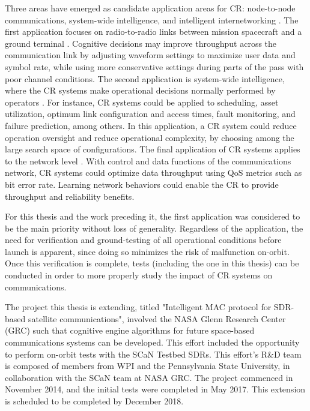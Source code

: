 	\par Three areas have emerged as candidate application areas for CR: node-to-node communications, system-wide intelligence, and intelligent internetworking \cite{paulo_thesis}. The first application focuses on radio-to-radio links between mission spacecraft and a ground terminal \cite{paulo_thesis}. Cognitive decisions may improve throughput across the communication link by adjusting waveform settings to maximize user data and symbol rate, while using more conservative settings during parts of the pass with poor channel conditions. The second application is system-wide intelligence, where the CR systems make operational decisions normally performed by operators \cite{paulo_thesis}. For instance, CR systems could be applied to scheduling, asset utilization, optimum link configuration and access times, fault monitoring, and failure prediction, among others. In this application, a CR system could reduce operation oversight and reduce operational complexity, by choosing among the large search space of configurations. The final application of CR systems applies to the network level \cite{paulo_thesis}. With control and data functions of the communications network, CR systems could optimize data throughput using QoS metrics such as bit error rate. Learning network behaviors could enable the CR to provide throughput and reliability benefits.
	\par  For this thesis and the work preceding it, the first application was considered to be the main priority without loss of generality. Regardless of the application, the need for verification and ground-testing of all operational conditions before launch is apparent, since doing so minimizes the risk of malfunction on-orbit. Once this verification is complete, tests (including the one in this thesis) can be conducted in order to more properly study the impact of CR systems on communications. 
	\par The project this thesis is extending, titled "Intelligent MAC protocol for SDR-based satellite communications", involved the NASA Glenn Research Center (GRC) such that cognitive engine algorithms for future space-based communications systems can be developed. This effort included the opportunity to perform on-orbit tests with the SCaN Testbed SDRs. This effort's R\&D team is composed of members from WPI and the Pennsylvania State University, in collaboration with the SCaN team at NASA GRC. The project commenced in November 2014, and the initial tests were completed in May 2017. This extension is scheduled to be completed by December 2018.
